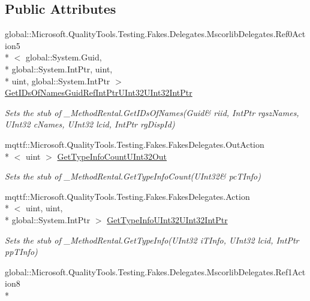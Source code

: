 \subsection*{Public Attributes}
\begin{DoxyCompactItemize}
\item 
global\-::\-Microsoft.\-Quality\-Tools.\-Testing.\-Fakes.\-Delegates.\-Mscorlib\-Delegates.\-Ref0\-Action5\\*
$<$ global\-::\-System.\-Guid, \\*
global\-::\-System.\-Int\-Ptr, uint, \\*
uint, global\-::\-System.\-Int\-Ptr $>$ \hyperlink{class_system_1_1_runtime_1_1_interop_services_1_1_fakes_1_1_stub___method_rental_a1ea514473499be4480bdf4eb1515999d}{Get\-I\-Ds\-Of\-Names\-Guid\-Ref\-Int\-Ptr\-U\-Int32\-U\-Int32\-Int\-Ptr}
\begin{DoxyCompactList}\small\item\em Sets the stub of \-\_\-\-Method\-Rental.\-Get\-I\-Ds\-Of\-Names(Guid\& riid, Int\-Ptr rgsz\-Names, U\-Int32 c\-Names, U\-Int32 lcid, Int\-Ptr rg\-Disp\-Id)\end{DoxyCompactList}\item 
mqttf\-::\-Microsoft.\-Quality\-Tools.\-Testing.\-Fakes.\-Fakes\-Delegates.\-Out\-Action\\*
$<$ uint $>$ \hyperlink{class_system_1_1_runtime_1_1_interop_services_1_1_fakes_1_1_stub___method_rental_a26035e836f98aa4525adce077923fb15}{Get\-Type\-Info\-Count\-U\-Int32\-Out}
\begin{DoxyCompactList}\small\item\em Sets the stub of \-\_\-\-Method\-Rental.\-Get\-Type\-Info\-Count(U\-Int32\& pc\-T\-Info)\end{DoxyCompactList}\item 
mqttf\-::\-Microsoft.\-Quality\-Tools.\-Testing.\-Fakes.\-Fakes\-Delegates.\-Action\\*
$<$ uint, uint, \\*
global\-::\-System.\-Int\-Ptr $>$ \hyperlink{class_system_1_1_runtime_1_1_interop_services_1_1_fakes_1_1_stub___method_rental_a1578a21f46a2d26b208989a0ae1f7481}{Get\-Type\-Info\-U\-Int32\-U\-Int32\-Int\-Ptr}
\begin{DoxyCompactList}\small\item\em Sets the stub of \-\_\-\-Method\-Rental.\-Get\-Type\-Info(\-U\-Int32 i\-T\-Info, U\-Int32 lcid, Int\-Ptr pp\-T\-Info)\end{DoxyCompactList}\item 
global\-::\-Microsoft.\-Quality\-Tools.\-Testing.\-Fakes.\-Delegates.\-Mscorlib\-Delegates.\-Ref1\-Action8\\*

\end{DoxyCompactItemize}
